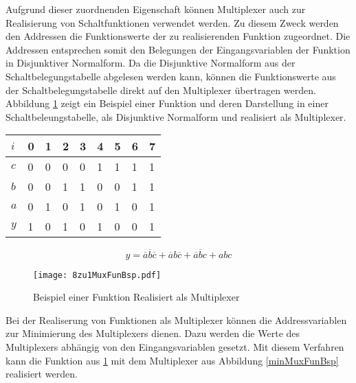 Aufgrund dieser zuordnenden Eigenschaft können Multiplexer auch zur Realisierung von Schaltfunktionen verwendet werden. Zu diesem Zweck werden den Addressen die Funktionswerte der zu realisierenden Funktion zugeordnet. Die Addressen entsprechen somit den Belegungen der Eingangsvariablen der Funktion in Disjunktiver Normalform. Da die Disjunktive Normalform aus der Schaltbelegungstabelle abgelesen werden kann, können die Funktionswerte aus der Schaltbelegungstabelle direkt auf den Multiplexer übertragen werden. Abbildung \ref{FunMuxBsp} zeigt ein Beispiel einer Funktion und deren Darstellung in einer Schaltbeleungstabelle, als Disjunktive Normalform und realisiert als Multiplexer.
\begin{table}[htp]
	\centering
	\begin{tabular}{*{9}{l}}    
	$i$ & 0 & 1 & 2 & 3 & 4 & 5 & 6 & 7 \\ \hline
	$c$ & 0 & 0 & 0 & 0 & 1 & 1 & 1 & 1 \\
	$b$ & 0 & 0 & 1 & 1 & 0 & 0 & 1 & 1 \\
	$a$ & 0 & 1 & 0 & 1 & 0 & 1 & 0 & 1 \\ \hline
	$y$ & 1 & 0 & 1 & 0 & 1 & 0 & 0 & 1 \\
	\end{tabular}
\end{table}
$$ y = \overline{a}\overline{b}\overline{c} + \overline{a}b\overline{c} + \overline{a}\overline{b}c + abc $$
\begin{figure}[htp]	
	\centering
	\texttt{[image: 8zu1MuxFunBsp.pdf]}
	\caption{Beispiel einer Funktion Realisiert als Multiplexer}
	\label{FunMuxBsp}
\end{figure}

Bei der Realiserung von Funktionen als Multiplexer können die Addressvariablen zur Minimierung des Multiplexers dienen. Dazu werden die Werte des Multiplexers abhängig von den Eingangsvariablen gesetzt. Mit diesem Verfahren kann die Funktion aus \ref{FunMuxBsp} mit dem Multiplexer aus Abbildung \ref{minMuxFunBsp} realisiert werden.


